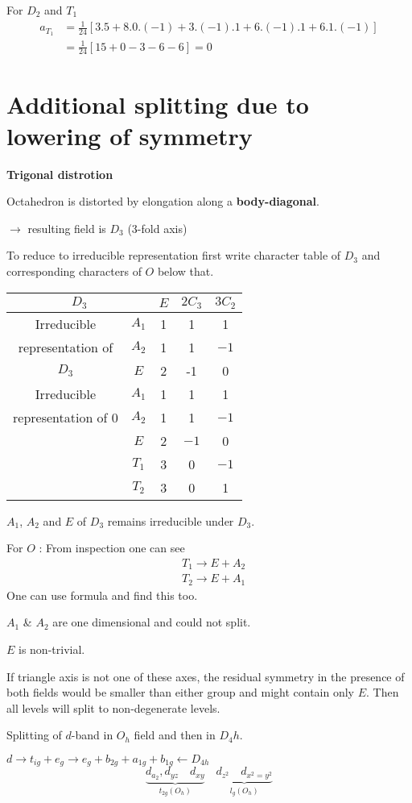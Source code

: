 \begin{example*}
For $D_{2}$  and $T_{1}$
\begin{align*}
a_{T_{1}} &= \frac{1}{24}[3.5+8.0.(-1)+3.(-1).1+6.(-1).1+6.1.(-1)]\\
&= \frac{1}{24}[15+0-3-6-6]=0
\end{align*}
\end{example*}

\section{Additional splitting due to lowering of symmetry}

\textbf{Trigonal distrotion}

Octahedron is distorted by elongation along a {\bf body-diagonal}.

$\to$ resulting field is $D_{3}$ (3-fold axis)

To reduce to irreducible representation first write character table of $D_{3}$ and corresponding characters of $O$ below that.
\begin{center}
\begin{tabular}{cc|ccc}
\hline
\multicolumn{2}{c|}{$D_{3}$} & $E$ & $2C_{3}$ & $3C_{2}$\\
\hline
Irreducible & $A_{1}$ & 1 & 1 & 1\\
representation of & $A_{2}$ & 1 & 1 & $-1$\\
$D_{3}$ & $E$ & 2 & -1 & 0\\
Irreducible & $A_{1}$ & 1 & 1 & 1\\
representation of $0$ & $A_{2}$ & 1 & 1 & $-1$\\
 & $E$ & 2 & $-1$ & 0\\
 & $T_{1}$ & 3 & 0 & $-1$\\
 & $T_{2}$ & 3 & 0 & 1\\
\hline
\end{tabular}
\end{center}
$A_{1}$, $A_{2}$ and $E$ of $D_{3}$ remains irreducible under $D_{3}$.

For $O$ : From inspection one can see
\begin{align*}
& T_{1}\to E+A_{2}\\
& T_{2}\to E+A_{1}
\end{align*}
One can use formula and find this too.

$A_{1}$ \& $A_{2}$ are one dimensional and could not split.

$E$ is non-trivial.

If triangle axis is not one of these axes, the residual symmetry in the presence of both fields would be smaller than either group and might contain only $E$. Then all levels will split to non-degenerate levels.

Splitting of $d$-band in $O_{h}$ field and then in $D_{4}h$.

$d\to t_{ig}+e_{g}\to e_{g}+b_{2g}+a_{1g}+b_{1g}\leftarrow D_{4h}$
$$
\underbrace{d_{a_{2}},d_{yz}\quad d_{xy}}_{t_{2g}(O_{h})}\quad \underbrace{d_{z^{2}}\quad d_{x^{2}=y^{2}}}_{l_{g}(O_{h})}
$$
